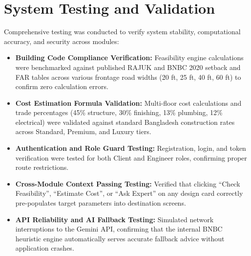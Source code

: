 \documentclass[12pt,a4paper]{article}
\begin{document}
\section{System Testing and Validation}
Comprehensive testing was conducted to verify system stability, computational accuracy, and security across modules:
\begin{itemize}
    \item \textbf{Building Code Compliance Verification:} Feasibility engine calculations were benchmarked against published RAJUK and BNBC 2020 setback and FAR tables across various frontage road widths (20 ft, 25 ft, 40 ft, 60 ft) to confirm zero calculation errors.
    \item \textbf{Cost Estimation Formula Validation:} Multi-floor cost calculations and trade percentages (45\% structure, 30\% finishing, 13\% plumbing, 12\% electrical) were validated against standard Bangladesh construction rates across Standard, Premium, and Luxury tiers.
    \item \textbf{Authentication and Role Guard Testing:} Registration, login, and token verification were tested for both Client and Engineer roles, confirming proper route restrictions.
    \item \textbf{Cross-Module Context Passing Testing:} Verified that clicking ``Check Feasibility'', ``Estimate Cost'', or ``Ask Expert'' on any design card correctly pre-populates target parameters into destination screens.
    \item \textbf{API Reliability and AI Fallback Testing:} Simulated network interruptions to the Gemini API, confirming that the internal BNBC heuristic engine automatically serves accurate fallback advice without application crashes.
\end{itemize}

\end{document}
